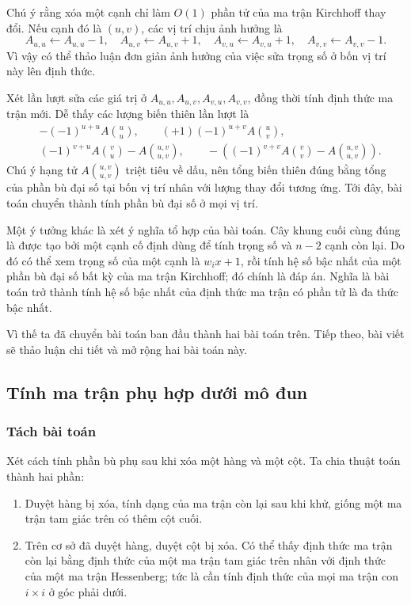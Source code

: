 \documentclass[11pt]{article}
\begin{document}
Chú ý rằng xóa một cạnh chỉ làm \(O(1)\) phần tử của ma trận Kirchhoff thay đổi.
Nếu cạnh đó là \((u,v)\), các vị trí chịu ảnh hưởng là
\[
  A_{u,u}\gets A_{u,u}-1,\quad
  A_{u,v}\gets A_{u,v}+1,\quad
  A_{v,u}\gets A_{v,u}+1,\quad
  A_{v,v}\gets A_{v,v}-1.
\]
Vì vậy có thể thảo luận đơn giản ảnh hưởng của việc sửa trọng số ở bốn vị trí
này lên định thức.

Xét lần lượt sửa các giá trị ở \(A_{u,u},A_{u,v},A_{v,u},A_{v,v}\), đồng thời
tính định thức ma trận mới. Dễ thấy các lượng biến thiên lần lượt là
\[
\begin{aligned}
&-(-1)^{u+u}A\binom{u}{u},\qquad
  (+1)(-1)^{u+v}A\binom{u}{v},\\
&(-1)^{v+u}A\binom{v}{u}-A\binom{u,v}{u,v},\qquad
-\left((-1)^{v+v}A\binom{v}{v}-A\binom{u,v}{u,v}\right).
\end{aligned}
\]
Chú ý hạng tử \(A\binom{u,v}{u,v}\) triệt tiêu về dấu, nên tổng biến thiên đúng
bằng tổng của phần bù đại số tại bốn vị trí nhân với lượng thay đổi tương ứng.
Tới đây, bài toán chuyển thành tính phần bù đại số ở mọi vị trí.

Một ý tưởng khác là xét ý nghĩa tổ hợp của bài toán. Cây khung cuối cùng đúng là
được tạo bởi một cạnh cố định dùng để tính trọng số và \(n-2\) cạnh còn lại. Do
đó có thể xem trọng số của một cạnh là \(w_ix+1\), rồi tính hệ số bậc nhất của
một phần bù đại số bất kỳ của ma trận Kirchhoff; đó chính là đáp án. Nghĩa là
bài toán trở thành tính hệ số bậc nhất của định thức ma trận có phần tử là đa
thức bậc nhất.

Vì thế ta đã chuyển bài toán ban đầu thành hai bài toán trên. Tiếp theo, bài
viết sẽ thảo luận chi tiết và mở rộng hai bài toán này.

\subsection{Tính ma trận phụ hợp dưới mô đun}

\subsubsection{Tách bài toán}

Xét cách tính phần bù phụ sau khi xóa một hàng và một cột. Ta chia thuật toán
thành hai phần:
\begin{enumerate}
  \item Duyệt hàng bị xóa, tính dạng của ma trận còn lại sau khi khử, giống một
  ma trận tam giác trên có thêm cột cuối.
  \item Trên cơ sở đã duyệt hàng, duyệt cột bị xóa. Có thể thấy định thức ma
  trận còn lại bằng định thức của một ma trận tam giác trên nhân với định thức
  của một ma trận Hessenberg; tức là cần tính định thức của mọi ma trận con
  \(i\times i\) ở góc phải dưới.
\end{enumerate}
\end{document}
